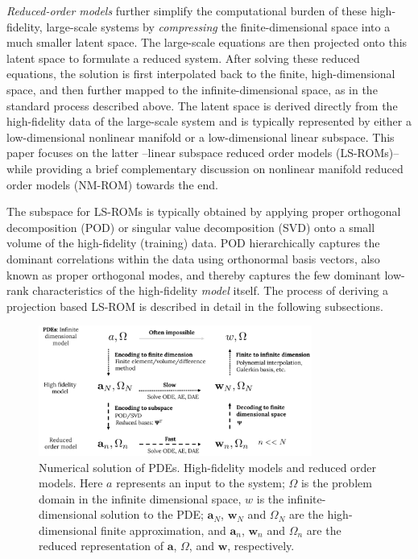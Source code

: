 \documentclass[11pt]{article}
\renewcommand{\vec}[1]{\mathbf{#1}}
\begin{document}
    \emph{Reduced-order models} further simplify the computational burden of these high-fidelity, large-scale systems by \emph{compressing} the finite-dimensional space into a much smaller latent space.
    The large-scale equations are then projected onto this latent space to formulate a reduced system.
    After solving these reduced equations, the solution is first interpolated back to the finite, high-dimensional space, and then further mapped to the infinite-dimensional space, as in the standard process described above.
    The latent space is derived directly from the high-fidelity data of the large-scale system and is typically represented  by either a low-dimensional nonlinear manifold or a low-dimensional linear subspace.
    This paper focuses on the latter --linear subspace reduced order models (LS-ROMs)-- while providing a brief complementary discussion on nonlinear manifold reduced order models (NM-ROM) towards the end.


    The subspace for LS-ROMs is typically obtained by applying proper orthogonal decomposition (POD) or singular value decomposition (SVD) onto a small volume of the high-fidelity (training) data.
    POD hierarchically captures the dominant correlations within the data using orthonormal basis vectors, also known as proper orthogonal modes, and thereby captures the few dominant low-rank characteristics of the high-fidelity \textit{model} itself.
    The process of deriving a projection based LS-ROM is described in detail in the following subsections.

    \begin{figure}[t]
        \centering
        \includegraphics[width=0.8\textwidth]{schematic.pdf}
        \caption{Numerical solution of PDEs. High-fidelity models and reduced order models. Here $a$ represents an input to the system; $\Omega$ is the problem domain in the infinite dimensional space, $w$ is the infinite-dimensional solution to the PDE; $\vec{a}_N$, $\vec{w}_N$ and $\Omega_N$ are the high-dimensional finite approximation, and $\vec{a}_n$, $\vec{w}_n$ and $\Omega_n$ are the reduced representation of  $\vec{a}$, $\Omega$, and $\vec{w}$, respectively.}
        \label{fig:ROM_FOM_schematic}
    \end{figure}
\end{document}
